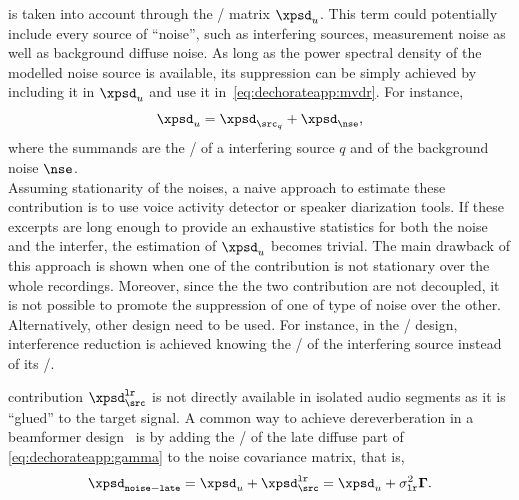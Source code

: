  is taken into account through the \xPSD/ matrix $\xpsd_u$.
This term could potentially include every source of ``noise'', such as interfering sources, measurement noise as well as background diffuse noise.
As long as the power spectral density of the modelled noise source is available, its suppression can be simply achieved by including it in $\xpsd_u$ and use it in~\cref{eq:dechorateapp:mvdr}.
For instance,
\begin{equation}
    \xpsd_u = \xpsd_{\src_q} + \xpsd_{\nse}
    ,
\end{equation}
where the summands are the \xPSD/ of a interfering source $q$ and of the background noise $\nse$.
\\Assuming stationarity of the noises, a na\:ive approach to estimate these contribution is to use voice activity detector or speaker diarization tools.
If these excerpts are long enough to provide an exhaustive statistics for both the noise and the interfer, the estimation of $\xpsd_u$ becomes trivial.
The main drawback of this approach is shown  when one of the contribution is not stationary over the whole recordings.
Moreover, since the the two contribution are not decoupled, it is not possible to promote the suppression of one of type of noise over the other.
Alternatively, other design need to be used.
For instance, in the \LCMVtxt/ design, interference reduction is achieved knowing the \RTF/ of the interfering source instead of its \xPSD/.

 contribution $\xpsd_{\src}^{\mathtt{lr}}$ is not directly available in isolated audio segments as it is ``glued'' to the target signal.
A common way to achieve dereverberation in a beamformer design~ is by adding
the \xPSD/ of the late diffuse part of \cref{eq:dechorateapp:gamma} to the noise covariance matrix, that is,
\begin{equation}
    \xpsd_{\mathtt{noise-late}} =  \xpsd_{u} + \xpsd_\src^{\mathtt{lr}} =  \xpsd_{u} + \sigma_{\mathtt{lr}}^2\mathbf{\Gamma}
    .
\end{equation}


